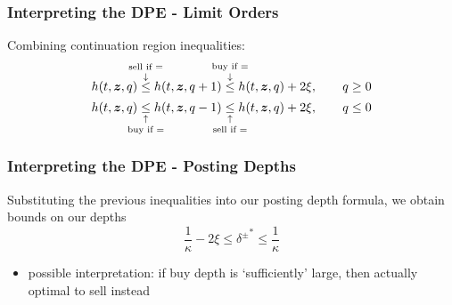 \begin{frame}
\frametitle{Interpreting the DPE - Limit Orders}
Combining continuation region inequalities:
\[ h(t,\bz,q) \overset{\text{\makebox[0pt]{sell if =}}}{\overset{\downarrow}{\leq}} h(t,\bz,q+1) \overset{\text{\makebox[0pt]{buy if =}}}{\overset{\downarrow}{\leq}} h(t,\bz,q) + 2\xi, \qquad q \geq 0 \] 
\[ h(t,\bz,q) \underset{\text{\makebox[0pt]{buy if =}}}{\underset{\uparrow}{\leq}} h(t,\bz,q-1) \underset{\text{\makebox[0pt]{sell if =}}}{\underset{\uparrow}{\leq}} h(t,\bz,q) + 2\xi, \qquad q \leq 0 \]
\end{frame}

\begin{frame}
\frametitle{Interpreting the DPE - Posting Depths}
Substituting the previous inequalities into our posting depth formula, we obtain bounds on our depths
\[ \frac{1}{\kappa} - 2\xi  \leq {\delta^\pm}^* \leq \frac{1}{\kappa} \]
\begin{itemize}
\item possible interpretation: if buy depth is `sufficiently' large, then actually optimal to sell instead
\end{itemize}
\end{frame}